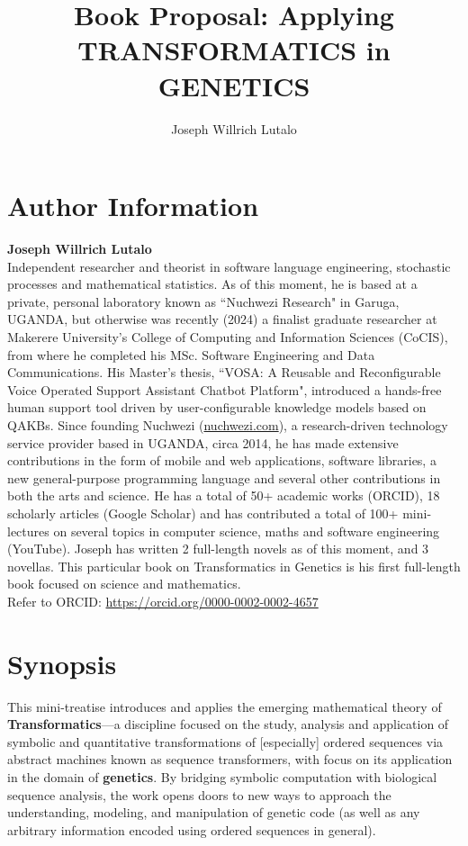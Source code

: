 \documentclass[12pt]{article}
\title{Book Proposal: Applying TRANSFORMATICS in GENETICS}
\author{Joseph Willrich Lutalo}
\date{}
\begin{document}
\maketitle

\section{Author Information}
\textbf{Joseph Willrich Lutalo} \\
Independent researcher and theorist in software language engineering, stochastic processes and mathematical statistics. As of this moment, he is based at a private, personal laboratory known as ``Nuchwezi Research" in Garuga, UGANDA, but otherwise was recently (2024) a finalist graduate researcher at Makerere University's College of Computing and Information Sciences (CoCIS), from where he completed his MSc. Software Engineering and Data Communications. His Master's thesis, ``VOSA: A Reusable and Reconfigurable Voice Operated Support Assistant Chatbot Platform", introduced a hands-free human support tool driven by user-configurable knowledge models based on QAKBs. Since founding Nuchwezi (\url{nuchwezi.com}), a research-driven technology service provider based in UGANDA, circa 2014, he has made extensive contributions in the form of mobile and web applications, software libraries, a new general-purpose programming language and several other contributions in both the arts and science. He has a total of 50+ academic works (ORCID), 18 scholarly articles (Google Scholar) and has contributed a total of 100+ mini-lectures on several topics in computer science, maths and software engineering (YouTube). Joseph has written 2 full-length novels as of this moment, and 3 novellas. This particular book on Transformatics in Genetics is his first full-length book focused on science and mathematics.\\

Refer to ORCID: \url{https://orcid.org/0000-0002-0002-4657}


\section{Synopsis}
This mini-treatise introduces and applies the emerging mathematical theory of \textbf{Transformatics}---a discipline focused on the study, analysis and application of symbolic and quantitative transformations of [especially] ordered sequences via abstract machines known as sequence transformers, with focus on its application in the domain of \textbf{genetics}. By bridging symbolic computation with biological sequence analysis, the work opens doors to new ways to approach the understanding, modeling, and manipulation of genetic code (as well as any arbitrary information encoded using ordered sequences in general).\\
\end{document}
